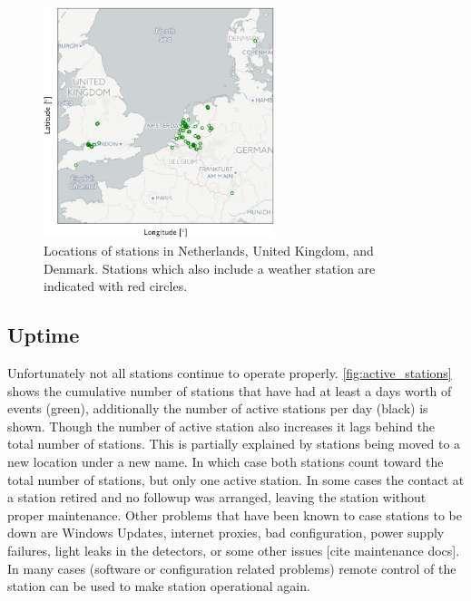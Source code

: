 \begin{figure}
    \centering
    \includegraphics[width=0.6\textwidth]
                    {plots/cluster/network}
    \caption{Locations of \hisparc stations in Netherlands, United Kingdom, and Denmark. Stations which also include a weather station are indicated with red circles.}
    \label{fig:network}
\end{figure}


\subsection{Uptime}

Unfortunately not all stations continue to operate properly. \cref{fig:active_stations} shows the cumulative number of stations that have had at least a days worth of events (green), additionally the number of active stations per day (black) is shown. Though the number of active station also increases it lags behind the total number of stations. This is partially explained by stations being moved to a new location under a new name. In which case both stations count toward the total number of stations, but only one active station. In some cases the contact at a station retired and no followup was arranged, leaving the station without proper maintenance. Other problems that have been known to case stations to be down are Windows Updates, internet proxies, bad configuration, power supply failures, light leaks in the detectors, or some other issues [cite maintenance docs]. In many cases (software or configuration related problems) remote control of the station can be used to make station operational again.

